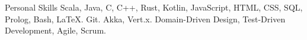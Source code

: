 
\begin{rubric}{Personal Skills}
	Scala, Java, C, C++, Rust, Kotlin, JavaScript, HTML, CSS, SQL, Prolog, Bash, LaTeX.
	Git.
	Akka, Vert.x.
	Domain-Driven Design, Test-Driven Development, Agile, Scrum.
\end{rubric}
